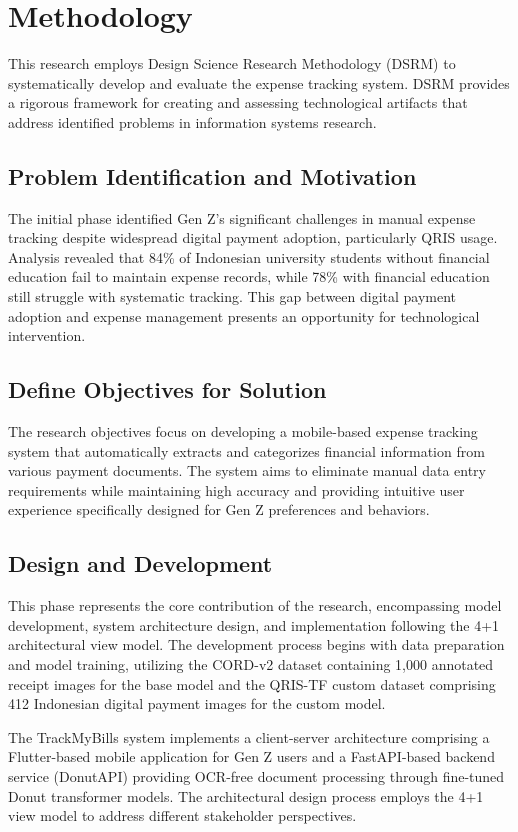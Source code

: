 \section{Methodology}

This research employs Design Science Research Methodology (DSRM) to systematically develop and evaluate the expense tracking system. DSRM provides a rigorous framework for creating and assessing technological artifacts that address identified problems in information systems research.

\subsection{Problem Identification and Motivation}
The initial phase identified Gen Z's significant challenges in manual expense tracking despite widespread digital payment adoption, particularly QRIS usage. Analysis revealed that 84\% of Indonesian university students without financial education fail to maintain expense records, while 78\% with financial education still struggle with systematic tracking. This gap between digital payment adoption and expense management presents an opportunity for technological intervention.

\subsection{Define Objectives for Solution}
The research objectives focus on developing a mobile-based expense tracking system that automatically extracts and categorizes financial information from various payment documents. The system aims to eliminate manual data entry requirements while maintaining high accuracy and providing intuitive user experience specifically designed for Gen Z preferences and behaviors.

\subsection{Design and Development}
This phase represents the core contribution of the research, encompassing model development, system architecture design, and implementation following the 4+1 architectural view model. The development process begins with data preparation and model training, utilizing the CORD-v2 dataset containing 1,000 annotated receipt images for the base model and the QRIS-TF custom dataset comprising 412 Indonesian digital payment images for the custom model.

The TrackMyBills system implements a client-server architecture comprising a Flutter-based mobile application for Gen Z users and a FastAPI-based backend service (DonutAPI) providing OCR-free document processing through fine-tuned Donut transformer models. The architectural design process employs the 4+1 view model to address different stakeholder perspectives.

